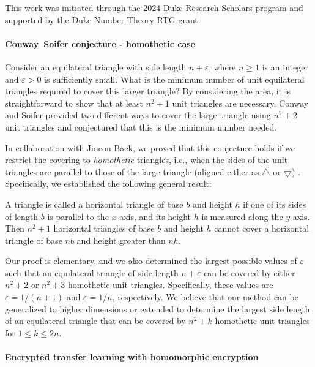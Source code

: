 \documentclass[letterpaper, 10pt]{article}
\begin{document}
This work was initiated through the 2024 Duke Research Scholars program and supported by the Duke Number Theory RTG grant.

\paragraph{Conway--Soifer conjecture - homothetic case}

Consider an equilateral triangle with side length $n + \varepsilon$, where $n \ge 1$ is an integer and $\varepsilon > 0$ is sufficiently small.
What is the minimum number of unit equilateral triangles required to cover this larger triangle?
By considering the area, it is straightforward to show that at least $n^2 + 1$ unit triangles are necessary.
Conway and Soifer provided two different ways to cover the large triangle using $n^2 + 2$ unit triangles and conjectured that this is the minimum number needed.

In collaboration with Jineon Baek, we proved that this conjecture holds if we restrict the covering to \emph{homothetic} triangles, i.e., when the sides of the unit triangles are parallel to those of the large triangle (aligned either as $\bigtriangleup$ or $\bigtriangledown$) \cite{baek2024equilateral}.
Specifically, we established the following general result:

\begin{theorem*} A triangle is called a horizontal triangle of base $b$ and height $h$ if one of its sides of length $b$ is parallel to the $x$-axis, and its height $h$ is measured along the $y$-axis. Then $n^2 + 1$ horizontal triangles of base $b$ and height $h$ cannot cover a horizontal triangle of base $nb$ and height greater than $nh$. \end{theorem*}

Our proof is elementary, and we also determined the largest possible values of $\varepsilon$ such that an equilateral triangle of side length $n + \varepsilon$ can be covered by either $n^2 + 2$ or $n^2 + 3$  homothetic unit triangles.
Specifically, these values are $\varepsilon= 1 / (n + 1)$ and $\varepsilon = 1 / n$, respectively.
We believe that our method can be generalized to higher dimensions or extended to determine the largest side length of an equilateral triangle that can be covered by $n^2 + k$ homothetic unit triangles for $1 \le k \le 2n$.


\paragraph{Encrypted transfer learning with homomorphic encryption}
\end{document}
